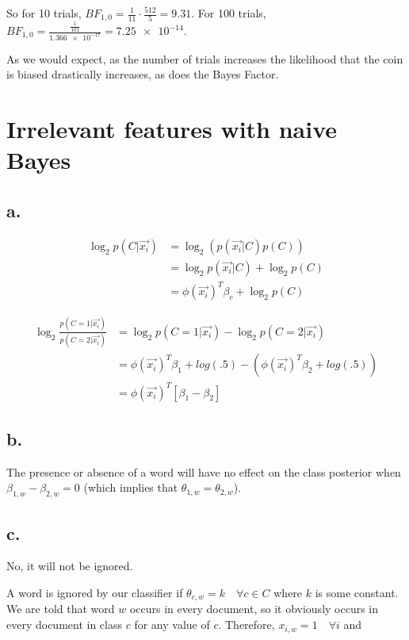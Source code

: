 \documentclass{article}
\begin{document}
So for 10 trials, $BF_{1,0} = \frac{1}{11} \cdot \frac{512}{5} = 9.31$.
For 100 trials, $BF_{1,0} = \frac{\frac{1}{101}}{\num{1.366e-17}} = \num{7.25e-14}$.

As we would expect, as the number of trials increases the likelihood
that the coin is biased drastically increases, as does the Bayes
Factor.

\section{Irrelevant features with naive Bayes}

\subsection{a.}

\begin{align*}
  \log_2 p(C|\vec{x_i}) &= \log_2 \left( p(\vec{x_i}|C) p(C) \right) \\
                        &= \log_2 p(\vec{x_i}|C) + \log_2 p(C) \\
                        &= \phi(\vec{x_i})^T \beta_c + \log_2 p(C)
\end{align*}

\begin{align*}
  \log_2 \frac{p(C=1|\vec{x_i})}{p(C=2|\vec{x_i})} &= \log_2 p(C=1|\vec{x_i}) - \log_2 p(C=2|\vec{x_i}) \\
      &= \phi(\vec{x_i})^T \beta_1 + log(.5) - (\phi(\vec{x_i})^T \beta_2 + log(.5)) \\
      &= \phi(\vec{x_i})^T \left[ \beta_1  - \beta_2 \right]
\end{align*}

\subsection{b.}

The presence or absence of a word will have no effect on the class
posterior when $\beta_{1,w} - \beta_{2,w} = 0$ (which implies that
$\theta_{1,w} = \theta_{2,w}$).

\subsection{c.}

No, it will not be ignored.

A word is ignored by our classifier if
$\theta_{c,w} = k \quad \forall c \in C$ where $k$ is some constant.
We are told that word $w$ occurs in every document, so it obviously
occurs in every document in class $c$ for any value of $c$. Therefore,
$x_{i,w} = 1 \quad \forall i$ and
\end{document}
